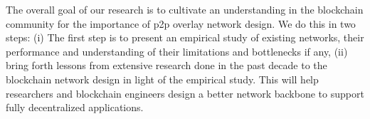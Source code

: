 \documentclass[journal]{IEEEtran}
\begin{document}
The overall goal of our research is to cultivate an understanding in the blockchain community for the importance of p2p
overlay network design. We do this in two steps: (i) The first step is to present an empirical study of existing
networks, their performance and understanding of their limitations and bottlenecks if any, (ii) bring forth lessons from
extensive research done in the past decade to the blockchain network design in light of the empirical study. 
This will help researchers and blockchain engineers design a better network backbone to support fully decentralized
applications.

%
%



%
%
\end{document}
